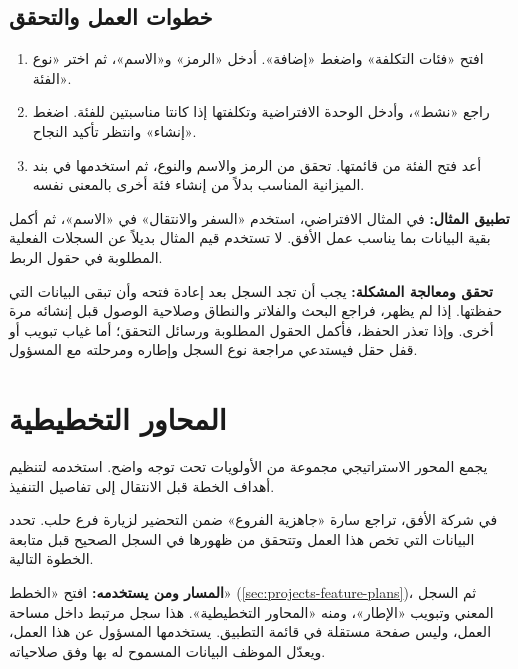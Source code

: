 \subsection{خطوات العمل والتحقق}
\begin{enumerate}
\item افتح «فئات التكلفة» واضغط «إضافة». أدخل «الرمز» و«الاسم»، ثم اختر «نوع الفئة».
\item راجع «نشط»، وأدخل الوحدة الافتراضية وتكلفتها إذا كانتا مناسبتين للفئة. اضغط «إنشاء» وانتظر تأكيد النجاح.
\item أعد فتح الفئة من قائمتها. تحقق من الرمز والاسم والنوع، ثم استخدمها في بند الميزانية المناسب بدلاً من إنشاء فئة أخرى بالمعنى نفسه.
\end{enumerate}

\textbf{تطبيق المثال:} في المثال الافتراضي، استخدم «السفر والانتقال» في «الاسم»، ثم أكمل بقية البيانات بما يناسب عمل الأفق. لا تستخدم قيم المثال بديلاً عن السجلات الفعلية المطلوبة في حقول الربط.

\textbf{تحقق ومعالجة المشكلة:} يجب أن تجد السجل بعد إعادة فتحه وأن تبقى البيانات التي حفظتها. إذا لم يظهر، فراجع البحث والفلاتر والنطاق وصلاحية الوصول قبل إنشائه مرة أخرى. وإذا تعذر الحفظ، فأكمل الحقول المطلوبة ورسائل التحقق؛ أما غياب تبويب أو قفل حقل فيستدعي مراجعة نوع السجل وإطاره ومرحلته مع المسؤول.

\clearpage
\section{المحاور التخطيطية}
\label{sec:projects-feature-planning-themes}

يجمع المحور الاستراتيجي مجموعة من الأولويات تحت توجه واضح. استخدمه لتنظيم أهداف الخطة قبل الانتقال إلى تفاصيل التنفيذ.

\begin{rcnote}
في شركة الأفق، تراجع سارة «جاهزية الفروع» ضمن التحضير لزيارة فرع حلب. تحدد البيانات التي تخص هذا العمل وتتحقق من ظهورها في السجل الصحيح قبل متابعة الخطوة التالية.
\end{rcnote}

\textbf{المسار ومن يستخدمه:} افتح «الخطط» (\ref{sec:projects-feature-plans})، ثم السجل المعني وتبويب «الإطار»، ومنه «المحاور التخطيطية». هذا سجل مرتبط داخل مساحة العمل، وليس صفحة مستقلة في قائمة التطبيق. يستخدمها المسؤول عن هذا العمل، ويعدّل الموظف البيانات المسموح له بها وفق صلاحياته.


